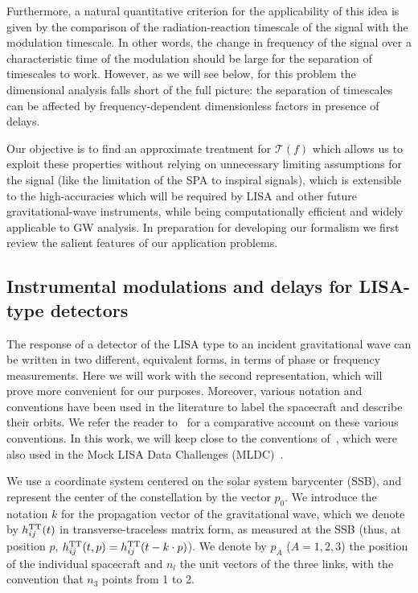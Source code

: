 \documentclass[aps,showpacs,twocolumn,
prd,superscriptaddress,nofootinbib]{revtex4-1}
\newcommand\calT{{\mathcal{T}}}
\newcommand{\hatk}{k}
\begin{document}
Furthermore, a natural quantitative criterion for the applicability of this idea is given by the comparison of the radiation-reaction timescale of the signal with the modulation timescale. In other words, the change in frequency of the signal over a characteristic time of the modulation should be large for the separation of timescales to work. However, as we will see below, for this problem the dimensional analysis falls short of the full picture: the separation of timescales can be affected by frequency-dependent dimensionless factors in presence of delays.

Our objective is to find an approximate treatment for $\calT(f)$ which allows us to exploit these properties without relying on unnecessary limiting assumptions for the signal (like the limitation of the SPA to inspiral signals), which is extensible to the high-accuracies which will be required by LISA and other future gravitational-wave instruments, while being computationally efficient and widely applicable to GW analysis. In preparation for developing our formalism we first review the salient features of our application problems.

\subsection{Instrumental modulations and delays for LISA-type detectors}
\label{subsec:modulationLISA}

The response of a detector of the LISA type to an incident gravitational wave can be written in two different, equivalent forms, in terms of phase or frequency measurements. Here we will work with the second representation, which will prove more convenient for our purposes. Moreover, various notation and conventions have been used in the literature to label the spacecraft and describe their orbits. We refer the reader to~\cite{Vallisneri04} for a comparative account on these various conventions. In this work, we will keep close to the conventions of~\cite{Vallisneri04}, which were also used in the Mock LISA Data Challenges (MLDC)~\cite{MLDC4}.

We use a coordinate system centered on the solar system barycenter (SSB), and represent the center of the constellation by the vector $p_{0}$. We introduce the notation $\hatk$ for the propagation vector of the gravitational wave, which we denote by $h_{ij}^{\rm TT}(t)$ in transverse-traceless matrix form, as measured at the SSB (thus, at position $p$, $h_{ij}^{\rm TT}(t, p) = h_{ij}^{\rm TT}(t - \hatk \cdot p)$). We denote by $p_{A}$ ($A=1,2,3$) the position of the individual spacecraft and $n_{l}$ the unit vectors of the three links, with the convention that $n_{3}$ points from 1 to 2.
\end{document}
